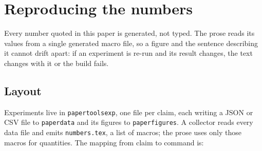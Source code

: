 \section{Reproducing the numbers}
\label{app:repro}

Every number quoted in this paper is generated, not typed. The prose reads its
values from a single generated macro file, so a figure and the sentence describing
it cannot drift apart: if an experiment is re-run and its result changes, the text
changes with it or the build fails.

\subsection{Layout}

Experiments live in \texttt{paper\pslash tools\pslash exp\pslash}, one file per
claim, each writing a JSON or CSV file to \texttt{paper\pslash data\pslash} and its
figures to \texttt{paper\pslash figures\pslash}. A collector reads every data file and emits
\texttt{numbers.tex}, a list of macros; the prose uses only those macros for
quantities. The mapping from claim to command is:

